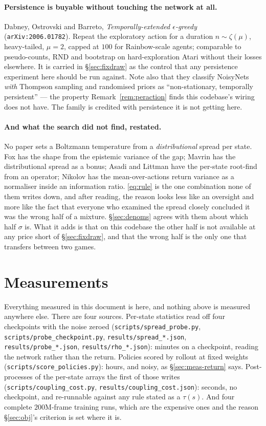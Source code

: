 \documentclass{article}
\newcommand{\srank}{\sigma}
\begin{document}
\paragraph{Persistence is buyable without touching the network at all.} Dabney, Ostrovski and
Barreto, \emph{Temporally-extended $\epsilon$-greedy} (\texttt{arXiv:2006.01782}). Repeat the
exploratory action for a duration $n \sim \zeta(\mu)$, heavy-tailed, $\mu = 2$, capped at $100$
for Rainbow-scale agents; comparable to pseudo-counts, RND and bootstrap on hard-exploration
Atari without their losses elsewhere. It is carried in \S\ref{sec:fixdraw} as the control that any persistence experiment here should
be run against. Note also that they classify NoisyNets \emph{with}
Thompson sampling and randomised priors as ``non-stationary, temporally persistent'' --- the
property Remark~\ref{rem:peraction} finds this codebase's wiring does not have. The family is
credited with persistence it is not getting here.

\paragraph{And what the search did not find, restated.} No paper sets a Boltzmann temperature
from a \emph{distributional} spread per state. Fox has the shape from the epistemic variance of
the gap; Mavrin has the distributional spread as a bonus; Asadi and Littman have the per-state
root-find from an operator; Nikolov has the mean-over-actions return variance as a normaliser
inside an information ratio. \eqref{eq:rule} is the one combination none of them writes down,
and after reading, the reason looks less like an oversight and more like the fact that everyone
who examined the spread closely concluded it was the wrong half of a mixture. \S\ref{sec:denoms}
agrees with them about which half $\srank$ is. What it adds is that on this codebase the other
half is not available at any price short of \S\ref{sec:fixdraw}, and that the wrong half is the
only one that transfers between two games.

\section{Measurements}
\label{sec:meas}

Everything measured in this document is here, and nothing above is measured anywhere else. There
are four sources. Per-state statistics read off four checkpoints with the noise zeroed
(\texttt{scripts/spread\_probe.py}, \texttt{scripts/probe\_checkpoint.py},
\texttt{results/spread\_*.json}, \texttt{results/probe\_*.json}, \texttt{results/rho\_*.json}):
minutes on a checkpoint, reading the network rather than the return. Policies scored by rollout
at fixed weights (\texttt{scripts/score\_policies.py}): hours, and noisy, as \S\ref{sec:meas-return}
says. Post-processes of the per-state arrays the first of those writes
(\texttt{scripts/coupling\_cost.py}, \texttt{results/coupling\_cost.json}): seconds, no
checkpoint, and re-runnable against any rule stated as a $\tau(s)$. And four complete $200$M-frame
training runs, which are the expensive ones and the reason \S\ref{sec:obj}'s criterion is set
where it is.
\end{document}
